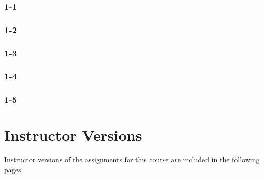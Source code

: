 \documentclass[preprint,12pt,authoryear]{elsarticle}
\begin{document}
\subsubsection*{1-1}
\subsubsection*{1-2}
\subsubsection*{1-3}
\subsubsection*{1-4}
\subsubsection*{1-5}


\newpage

\section*{Instructor Versions}
Instructor versions of the assignments for this course are included in the following pages.
% 

% 
% 
% 
% 
% 


\appendix

%
%
%









 


\end{document}
